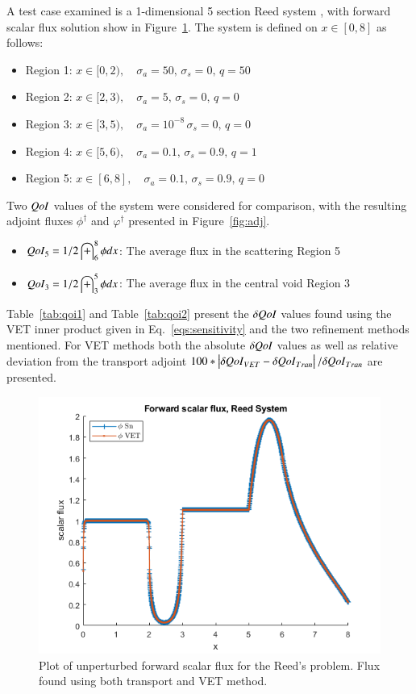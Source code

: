 \documentclass{anstrans}
\newcommand{\sigs}{\sigma_s}
\newcommand{\siga}{\sigma_a}
\newcommand{\qoi}{{\it QoI}\xspace}
\begin{document}
A test case examined is a 1-dimensional 5 section Reed system \cite{ReedProb}, with forward scalar flux solution show in Figure~\ref{fig:Flux4}. The system is defined on  $x \in [0,8]$ as follows:
\begin{itemize}
\item Region 1: $x \in [0,2), \quad \siga=50, \, 			\sigs=0, \, q=50$
\item Region 2: $x \in [2,3), \quad \siga=5, \, 			\sigs=0, \, q=0$
\item Region 3: $x \in [3,5), \quad \siga=10^{-8} \,	\sigs=0, \, q=0$
\item Region 4: $x \in [5,6), \quad \siga=0.1, \, 		\sigs=0.9, \, q=1$
\item Region 5: $x \in [6,8], \quad \siga=0.1, \, 		\sigs=0.9, \, q=0$
\end{itemize}
 Two $\qoi$ values of the system were considered for comparison, with the resulting adjoint fluxes $\phi^\dag$ and $\varphi^\dag$ presented in Figure~\ref{fig:adj}.
 
 \begin{itemize}
\item $\qoi_5 =1/2 \int_6^8 \phi dx $: The average flux in the scattering Region 5

\item $\qoi_3 =1/2 \int_3^5 \phi dx $: The average flux in the central void Region 3
 \end{itemize}

Table~\ref{tab:qoi1} and Table~\ref{tab:qoi2} present the $\delta \qoi$ values found using the VET inner product given in Eq.~\eqref{eqs:sensitivity} and the two refinement methods mentioned. For VET methods both the absolute $\delta \qoi$ values as well as relative deviation from the transport adjoint $ 100*\left| \delta \qoi_{VET} - \delta \qoi_{Tran}\right|/ \delta \qoi_{Tran}$ are presented.



\begin{figure}[h]
 \includegraphics[scale=0.5]{7phi.png}
 \caption{Plot of unperturbed forward scalar flux for the Reed's problem. Flux found using both transport and VET method.}
\label{fig:Flux4}
\end{figure}
\end{document}

